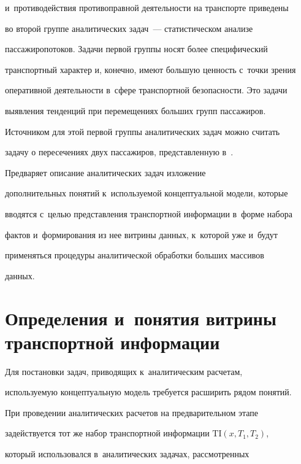 и~противодействия противоправной деятельности на транспорте приведены 


во второй группе аналитических задач~--- статистическом анализе 


пассажиропотоков. Задачи первой группы носят более специфический 


транспортный характер и, конечно, имеют большую ценность с~точки зрения 


оперативной деятельности в~сфере транспортной безопас\-ности. Это задачи 


выявления тенденций при перемещениях больших групп пассажиров. 


Источником для этой первой группы аналитических задач можно считать 


задачу о пересечениях двух пассажиров, представленную в~\cite{3-bi}.


      


      Предваряет описание аналитических задач изложение 


дополнительных понятий к~используемой концептуальной модели, которые 


вводятся с~целью пред\-став\-ле\-ния транспортной информации в~форме набора 


фактов и~формирования из нее витрины данных, к~которой уже и~будут 


применяться процедуры аналитической обработки больших массивов 


данных.


      


\section{Определения и~понятия витрины транспортной информации}





      Для постановки задач, приводящих к~аналитическим расчетам, 


используемую концептуальную модель требуется расширить рядом понятий.


      


      При проведении аналитических расчетов на предварительном этапе 


задействуется тот же набор транспортной информации $\mathrm{TI}(x, T_1, T_2)$, 


который использовался в~аналитических задачах, рассмотренных  


